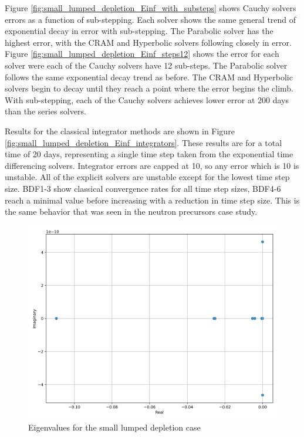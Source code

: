 Figure \ref{fig:small_lumped_depletion_Einf_with_substeps} shows Cauchy solvers errors as a function of sub-stepping. Each solver shows the same general trend of exponential decay in error with sub-stepping. The Parabolic solver has the highest error, with the CRAM and Hyperbolic solvers following closely in error. Figure \ref{fig:small_lumped_depletion_Einf_steps12} shows the error for each solver were each of the Cauchy solvers have 12 sub-steps. The Parabolic solver follows the same exponential decay trend as before. The CRAM and Hyperbolic solvers begin to decay until they reach a point where the error begins the climb. With sub-stepping, each of the Cauchy solvers achieves lower error at 200 days than the series solvers. 

Results for the classical integrator methods are shown in Figure \ref{fig:small_lumped_depletion_Einf_integrators}. These results are for a total time of 20 days, representing a single time step taken from the exponential time differencing solvers. Integrator errors are capped at 10, so any error which is 10 is unstable. All of the explicit solvers are unstable except for the lowest time step size. BDF1-3 show classical convergence rates for all time step sizes, BDF4-6 reach a minimal value before increasing with a reduction in time step size. This is the same behavior that was seen in the neutron precursors case study. 


\clearpage

\begin{figure}[p]
    \centering
    \includegraphics[width=5in]{images/chapter-5/caseStudies/smallLumpedDepletion/msrLumpedDepletionSmallEigenvalues.png}
    \caption{Eigenvalues for the small lumped depletion case}
    \label{fig:small_lumped_depletion_eigenvalues}
\end{figure}

